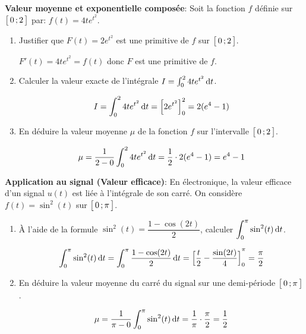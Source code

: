 \documentclass[11pt, a4paper]{report}
\begin{document}
\textbf{Valeur moyenne et exponentielle composée}: 
Soit la fonction $f$ définie sur $\bigl[ \, 0 \, ; 2 \,\bigl]$ par: $f(t) = 4t e^{t^2}$.
\begin{enumerate}
    \item Justifier que $F(t) = 2e^{t^2}$ est une primitive de $f$ sur $\bigl[ \, 0 \, ; 2 \,\bigl]$.
    \begin{blocvisible}[height=2]
    $F'(t) = 4t e^{t^2} = f(t)$ donc $F$ est une primitive de $f$.
    \end{blocvisible}

    \item Calculer la valeur exacte de l'intégrale $I = \int_{0}^{2} 4t e^{t^2} \,\mathrm{d}t$.
    \begin{blocvisible}[height=2]
        \[I = \int_{0}^{2} 4t e^{t^2} \,\mathrm{d}t = {\Big[2e^{t^2} \Big]}_{0}^{2} = 2(e^4 - 1)\]

    \end{blocvisible}

    \item En déduire la valeur moyenne $\mu$ de la fonction $f$ sur l'intervalle $\bigl[ \, 0 \, ; 2 \,\bigl]$. 
    \begin{blocvisible}[height=2]
        \[\mu = \frac{1}{2-0} \int_{0}^{2} 4t e^{t^2} \,\mathrm{d}t = \frac{1}{2} \cdot 2(e^4 - 1) = e^4 - 1\]
    \end{blocvisible}
\end{enumerate}

\bigskip
\pagebreak
\thispagestyle{DS_LP}
 \medskip

\textbf{Application au signal (Valeur efficace)}: 
En électronique, la valeur efficace d'un signal $u(t)$ est liée à l'intégrale de son carré. On considère $f(t) = \sin^2(t)$ sur $\bigl[ \, 0 \, ; \pi \,\bigl]$.
\begin{enumerate}
    \item À l'aide de la formule $\sin^2(t) = \dfrac{1-\cos(2t)}{2}$, calculer $\displaystyle\int_{0}^{\pi} \sin^2(t) \,\mathrm{d}t$.
    \begin{blocvisible}[height=2]
        \[\int_{0}^{\pi} \sin^2(t) \,\mathrm{d}t = \int_{0}^{\pi} \frac{1-\cos(2t)}{2} \,\mathrm{d}t = {\Big[\frac{t}{2} - \frac{\sin(2t)}{4}\Big]}_{0}^{\pi} = \frac{\pi}{2}\]
    \end{blocvisible}
    \item En déduire la valeur moyenne du carré du signal sur une demi-période $\bigl[ \, 0 \, ; \pi \,\bigl]$.
    \begin{blocvisible}[height=2]
        \[\mu = \frac{1}{\pi-0} \int_{0}^{\pi} \sin^2(t) \,\mathrm{d}t = \frac{1}{\pi} \cdot \frac{\pi}{2} = \frac{1}{2}\]
    \end{blocvisible}
\end{enumerate}
\end{document}
